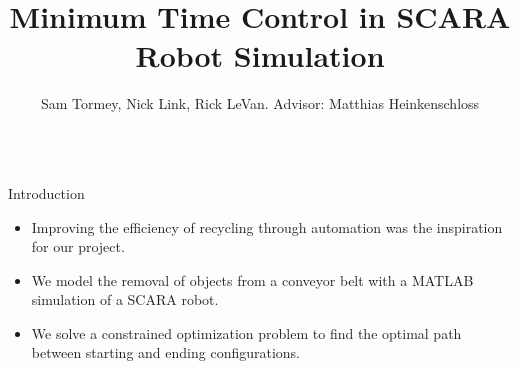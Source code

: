 \documentclass[final]{beamer}
\title[Fancy Posters]{Minimum Time Control in SCARA Robot Simulation}
\author{Sam Tormey, Nick Link, Rick LeVan. Advisor: Matthias Heinkenschloss}
\institute{Department of Computational and Applied Mathematics, Rice University}
\begin{document}
        \begin{frame}{}
        
        \vfill
        \vspace{-1.5cm}
{\footnotesize
\begin{columns}[t]
        
\hspace{0.7cm}
\begin{column}{.30\linewidth}
                
\begin{block}{\centering Introduction}
		


\vspace{0.3cm}


\begin{itemize}
		\item Improving the efficiency of recycling through automation was the inspiration for our project.
	\item We model the removal of objects from a conveyor belt with a MATLAB simulation of a SCARA robot.

	\item We solve a constrained optimization problem to find the optimal path between starting and
ending configurations. 
\end{itemize}


\end{block}
\end{column}
\end{columns}}
\end{frame}
\end{document}
